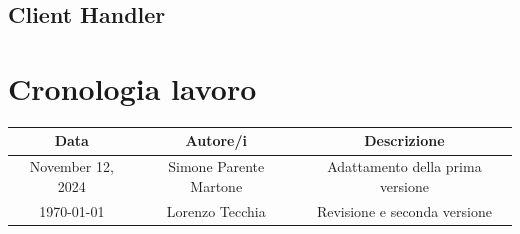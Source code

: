 \documentclass[a4paper, 12pt]{article}
\begin{document}
\subsection{Client Handler}



\section{Cronologia lavoro}
\begin{center}
    \begin{tabular}{|c|c|c|}
        \hline
        \textbf{Data} & \textbf{Autore/i} & \textbf{Descrizione} \\
        \hline
        November 12, 2024 & Simone Parente Martone & Adattamento della prima versione \\
        \hline
        {\today} & Lorenzo Tecchia & Revisione e seconda versione \\
        \hline
    \end{tabular}
\end{center}
\end{document}
